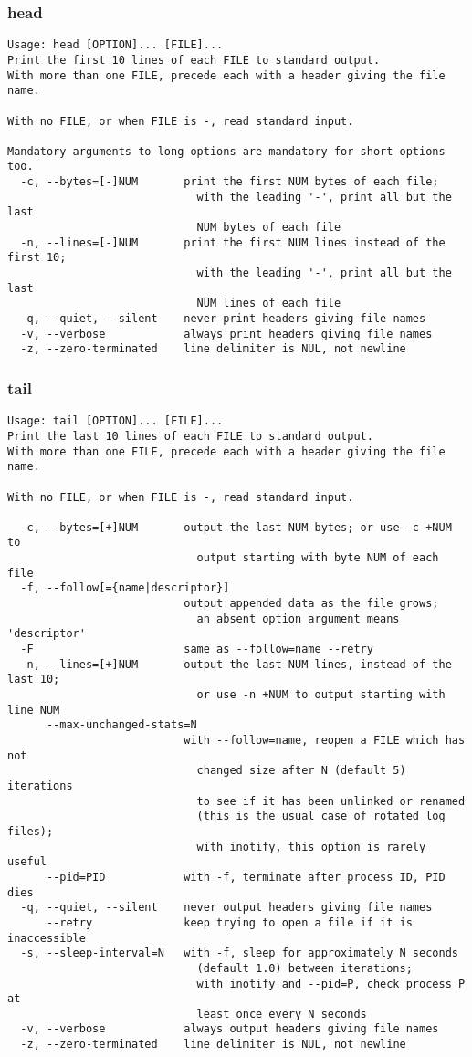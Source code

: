\documentclass[11pt,a4paper]{article}
\newcommand{\cmd}[1]{
  \subsubsection*{#1}
  \addcontentsline{toc}{subsection}{#1}
}
\begin{document}
\cmd{head}
\begin{verbatim}
Usage: head [OPTION]... [FILE]...
Print the first 10 lines of each FILE to standard output.
With more than one FILE, precede each with a header giving the file name.

With no FILE, or when FILE is -, read standard input.

Mandatory arguments to long options are mandatory for short options too.
  -c, --bytes=[-]NUM       print the first NUM bytes of each file;
                             with the leading '-', print all but the last
                             NUM bytes of each file
  -n, --lines=[-]NUM       print the first NUM lines instead of the first 10;
                             with the leading '-', print all but the last
                             NUM lines of each file
  -q, --quiet, --silent    never print headers giving file names
  -v, --verbose            always print headers giving file names
  -z, --zero-terminated    line delimiter is NUL, not newline
\end{verbatim}


\cmd{tail}
\begin{verbatim}
Usage: tail [OPTION]... [FILE]...
Print the last 10 lines of each FILE to standard output.
With more than one FILE, precede each with a header giving the file name.

With no FILE, or when FILE is -, read standard input.

  -c, --bytes=[+]NUM       output the last NUM bytes; or use -c +NUM to
                             output starting with byte NUM of each file
  -f, --follow[={name|descriptor}]
                           output appended data as the file grows;
                             an absent option argument means 'descriptor'
  -F                       same as --follow=name --retry
  -n, --lines=[+]NUM       output the last NUM lines, instead of the last 10;
                             or use -n +NUM to output starting with line NUM
      --max-unchanged-stats=N
                           with --follow=name, reopen a FILE which has not
                             changed size after N (default 5) iterations
                             to see if it has been unlinked or renamed
                             (this is the usual case of rotated log files);
                             with inotify, this option is rarely useful
      --pid=PID            with -f, terminate after process ID, PID dies
  -q, --quiet, --silent    never output headers giving file names
      --retry              keep trying to open a file if it is inaccessible
  -s, --sleep-interval=N   with -f, sleep for approximately N seconds
                             (default 1.0) between iterations;
                             with inotify and --pid=P, check process P at
                             least once every N seconds
  -v, --verbose            always output headers giving file names
  -z, --zero-terminated    line delimiter is NUL, not newline
\end{verbatim}
\end{document}
